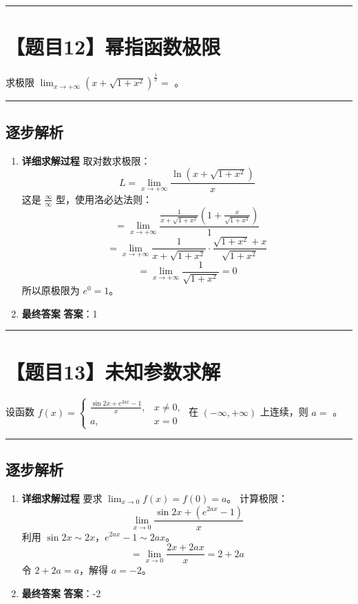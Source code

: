 \documentclass[UTF8]{ctexart}
\newenvironment{redenv}{\color{red}}{}
\newenvironment{detailedanalysis}{%
    \color{red}
    \begin{enumerate}[label=\textbf{第\arabic*步：}, leftmargin=*, align=left, itemsep=1.5ex]
}{%
    \end{enumerate}
}
\newcommand{\problemrule}{\noindent\rule{\textwidth}{1.5pt}\vspace{-0.8em}}
\newcommand{\analysisrule}{\noindent\rule{\textwidth}{0.8pt}\vspace{-0.8em}}
\newcommand{\blank}[1]{\underline{\hspace{#1}}}
\begin{document}
\problemrule
\section*{【题目12】幂指函数极限}
求极限 $ \lim_{x\to+\infty}\left(x+\sqrt{1+x^{2}}\right)^{\frac{1}{x}}= $ \blank{2cm}。

\begin{redenv}
\analysisrule
\subsection*{逐步解析}

\begin{detailedanalysis}
\item \textbf{详细求解过程}
取对数求极限：
$$ L = \lim_{x \to +\infty} \frac{\ln(x + \sqrt{1+x^2})}{x} $$
这是 $\frac{\infty}{\infty}$ 型，使用洛必达法则：
$$ = \lim_{x \to +\infty} \frac{\frac{1}{x+\sqrt{1+x^2}}(1 + \frac{x}{\sqrt{1+x^2}})}{1} $$
$$ = \lim_{x \to +\infty} \frac{1}{x+\sqrt{1+x^2}} \cdot \frac{\sqrt{1+x^2}+x}{\sqrt{1+x^2}} $$
$$ = \lim_{x \to +\infty} \frac{1}{\sqrt{1+x^2}} = 0 $$
所以原极限为 $e^0 = 1$。

\item \textbf{最终答案}
\textbf{答案}：1
\end{detailedanalysis}
\end{redenv}

\problemrule
\section*{【题目13】未知参数求解}
设函数 $ f(x)=\begin{cases}\frac{\sin2x+e^{2ax}-1}{x}, & x\neq0,\\ a, & x=0\end{cases} $ 在 $ (-\infty,+\infty) $ 上连续，则 $ a= $ \blank{2cm}。

\begin{redenv}
\analysisrule
\subsection*{逐步解析}

\begin{detailedanalysis}
\item \textbf{详细求解过程}
要求 $\lim_{x \to 0} f(x) = f(0) = a$。
计算极限：
$$ \lim_{x \to 0} \frac{\sin 2x + (e^{2ax} - 1)}{x} $$
利用 $\sin 2x \sim 2x$，$e^{2ax} - 1 \sim 2ax$。
$$ = \lim_{x \to 0} \frac{2x + 2ax}{x} = 2 + 2a $$
令 $2 + 2a = a$，解得 $a = -2$。

\item \textbf{最终答案}
\textbf{答案}：-2
\end{detailedanalysis}
\end{redenv}
\end{document}
